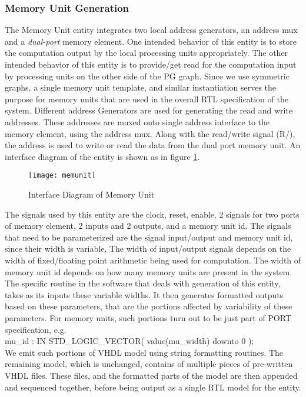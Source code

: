 \documentclass[12pt]{article}
\begin{document}
\subsubsection{Memory Unit Generation}
The Memory Unit entity integrates two local address generators, an address
mux and a \textit{dual-port} memory element. One intended behavior of this
entity is to store the computation output by the local processing units
appropriately. The other intended behavior of this entity is to provide/get
read for the computation input by processing units on the other side of the
PG graph. Since we use symmetric graphs, a single memory unit template, and
similar instantiation serves the purpose for memory units that are used in
the overall RTL specification of the system. Different address Generators
are used for generating the read and write addresses. These addresses are
muxed onto single address interface to the memory element, using the
address mux. Along with the read/write signal (R/), the
address is used to write or read the data from the dual port memory unit.
An interface diagram of the entity is shown as in figure
\ref{mem_unit_fig}.

\begin{figure}[h]
\begin{center}
\texttt{[image: memunit]}
\end{center}
\caption{Interface Diagram of Memory Unit}
\label{mem_unit_fig}
\end{figure}

The signals used by this entity are the clock, reset, enable, 2
 signals for two ports of memory element, 2 inputs and 2
outputs, and a memory unit id. The signals that need to be parameterized
are the signal input/output and memory unit id, since their width is
variable. The width of input/output signals depends on the width of
fixed/floating point arithmetic being used for computation. The width of
memory unit id depends on how many memory units are present in the system.
The specific routine in the software that deals with generation of this
entity, takes as its inputs these variable widths. It then generates
formatted outputs based on these parameters, that are the portions affected
by variability of these parameters. For memory units, such portions turn
out to be just part of PORT specification, e.g. \\
           mu\_id     : IN STD\_LOGIC\_VECTOR( value(mu\_width) downto 0 );
           \\

We emit such portions of VHDL model using string formatting
routines. The remaining model, which is unchanged, contains of multiple
pieces of pre-written VHDL files. These files, and the formatted parts of
the model are then appended and sequenced together, before being output as
a single RTL model for the entity.
\end{document}
